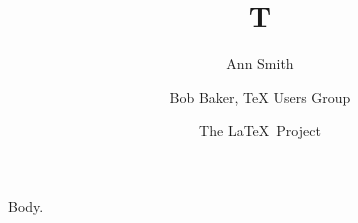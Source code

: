 \documentclass{article}
\begin{document}
\title{T}
\author{Ann Smith \and Bob Baker, \TeX{} Users Group \and The \LaTeX\ Project}
\maketitle
Body.
\end{document}
